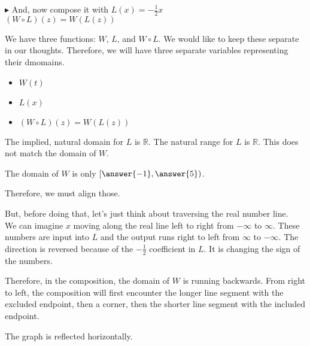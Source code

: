 \documentclass{ximera}
\begin{document}
$\blacktriangleright$ And, now compose it with $L(x) = -\frac{1}{2}x$ \\



$(W \circ L)(z) = W(L(z))$



\begin{explanation}

We have three functions: $W$, $L$, and $W \circ L$.  We would like to keep these separate in our thoughts.  Therefore, we will have three separate variables representing their dmomains.


\begin{itemize}
\item $W(t)$
\item $L(x)$
\item $(W \circ L)(z) = W(L(z))$
\end{itemize}

\end{explanation}






The implied, natural domain for $L$ is \textbf{$\mathbb{R}$}.  The natural range for $L$ is \textbf{$\mathbb{R}$}. This does not match the domain of $W$.  


\begin{question}


The domain of $W$ is only $\left[ \answer{-1}, \answer{5} \right)$. 

\end{question}

Therefore, we must align those.

But, before doing that, let's just think about traversing the real number line. \\

We can imagine $x$ moving along the real line left to right from $-\infty$ to $\infty$. These numbers are input into $L$ and the output runs right to left from $\infty$ to $-\infty$.  The direction is reversed because of the $-\frac{1}{2}$ coefficient in $L$.  It is changing the sign of the numbers.


Therefore, in the composition, the domain of $W$ is running backwards.  From right to left, the composition will first encounter the longer line segment with the excluded endpoint, then a corner, then the shorter line segment with the included endpoint.

The graph is reflected horizontally. \\
\end{document}
